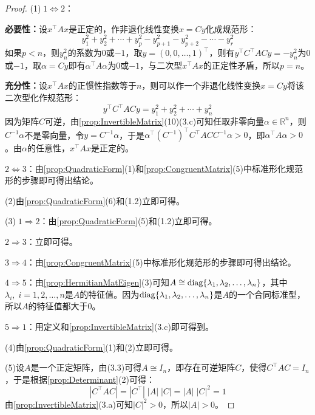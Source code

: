 \begin{proof}
	(1)$\;1\iff2$：\par
	\textbf{必要性：}设$x^{\top}Ax$是正定的，作非退化线性变换$x=Cy$化成规范形：
	\begin{equation*}
		y_1^2+y_2^2+\cdots+y_p^2-y_{p+1}^2-y_{p+2}^2-\cdots-y_r^2
	\end{equation*}
	如果$p<n$，则$y_n^2$的系数为$0$或$-1$，取$y=(0,0,\dots,1)^{\top}$，则有$y^{\top}C^{\top}ACy=-y_n^2$为$0$或$-1$，取$\alpha=Cy$即有$\alpha^{\top}A\alpha$为$0$或$-1$，与二次型$x^{\top}Ax$的正定性矛盾，所以$p=n$。\par
	\textbf{充分性：}设$x^{\top}Ax$的正惯性指数等于$n$，则可以作一个非退化线性变换$x=Cy$将该二次型化作规范形：
	\begin{equation*}
		y^{\top}C^{\top}ACy=y_1^2+y_2^2+\cdots+y_n^2
	\end{equation*}
	因为矩阵$C$可逆，由\cref{prop:InvertibleMatrix}(10)(3.c)可知任取非零向量$\alpha\in\mathbb{R}^{n}$，则$C^{-1}\alpha$不是零向量，令$y=C^{-1}\alpha$，于是$\alpha^{\top}(C^{-1})^{\top}C^{\top}ACC^{-1}\alpha>0$，即$\alpha^{\top}A\alpha>0$。由$\alpha$的任意性，$x^{\top}Ax$是正定的。\par
	$2\iff3$：由\cref{prop:QuadraticForm}(1)和\cref{prop:CongruentMatrix}(5)中标准形化规范形的步骤即可得出结论。\par
	(2)由\cref{prop:QuadraticForm}(6)和(1.2)立即可得。\par	
	(3)$\;1\Rightarrow2$：由\cref{prop:QuadraticForm}(5)和(1.2)立即可得。\par
	$2\Rightarrow3$：立即可得。\par
	$3\Rightarrow4$：由\cref{prop:CongruentMatrix}(5)中标准形化规范形的步骤即可得出结论。\par
	$4\Rightarrow5$：由\cref{prop:HermitianMatEigen}(3)可知$A\cong\operatorname{diag}\{\lambda_1, \lambda_2, \dots, \lambda_{n}\}$，其中$\lambda_i,\;i=1,2,\dots,n$是$A$的特征值。因为$\operatorname{diag}\{\lambda_1, \lambda_2, \dots, \lambda_{n}\}$是$A$的一个合同标准型，所以$A$的特征值都大于$0$。\par
	$5\Rightarrow1$：用定义和\cref{prop:InvertibleMatrix}(3.c)即可得到。\par
	(4)由\cref{prop:QuadraticForm}(1)和(2)立即可得。\par
	(5)设$A$是一个正定矩阵，由(3.3)可得$A\cong I_n$，即存在可逆矩阵$C$，使得$C^{\top}AC=I_n$，于是根据\cref{prop:Determinant}(2)可得：
	\begin{equation*}
		|C^{\top}AC|=|C^{\top}|\;|A|\;|C|=|A|\;|C|^2=1
	\end{equation*}
	由\cref{prop:InvertibleMatrix}(3.a)可知$|C|^2>0$，所以$|A|>0$。\par

\end{proof}
